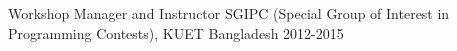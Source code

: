 \begin{cventries}
 \cventry
    {Workshop Manager and Instructor} %
    {SGIPC (Special Group of Interest in Programming Contests), KUET} %
    {Bangladesh} %
    {2012-2015} %
    {}
    {}

 \vspace*{-3mm}
    
\end{cventries}
